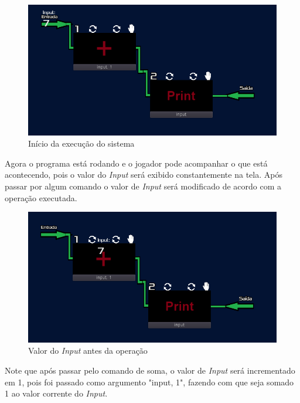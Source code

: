 \begin{figure}[H]
    \includegraphics[width=\textwidth]{../figuras/inicio_da_execucao.png}
    \caption{Início da execu\c{c}\~{a}o do sistema}
\end{figure}

Agora o programa está rodando e o jogador pode acompanhar o que está 
acontecendo, pois o valor do \textit{Input} será exibido constantemente na tela.
Após passar por algum comando o valor de \textit{Input} será modificado de 
acordo com a operação executada.

\begin{figure}[H]
    \includegraphics[width=\textwidth]{../figuras/antes_da_soma.png}
    \caption{Valor do \textit{Input} antes da opera\c{c}\~{a}o}
\end{figure}

Note que após passar pelo comando de soma, o valor de \textit{Input} será 
incrementado em 1, pois foi passado como argumento "input, 1", fazendo com que 
seja somado 1 ao valor corrente do \textit{Input}.

